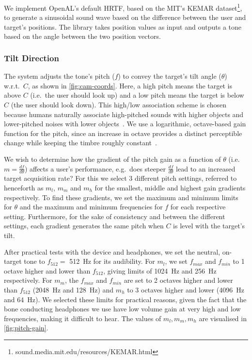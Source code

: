 \documentclass[sigconf, screen=true, anonymous=true]{acmart}
\begin{document}
We implement OpenAL's default HRTF, based on the MIT's KEMAR dataset\footnote{sound.media.mit.edu/resources/KEMAR.html}, to generate a sinusoidal sound wave based on the difference between the user and target's positions.
The library takes position values as input and outputs a tone based on the angle between the two position vectors. 

\subsubsection{Tilt Direction}

The system adjusts the tone's pitch ($f$) to convey the target's tilt angle ($\theta$) w.r.t.\ $C$, as shown in \cref{fig:cam-coords}. 
Here, a high pitch means the target is above $C$ (i.e.\ the user should look up) and a low pitch means the target is below $C$ (the user should look down).
This high/low association scheme is chosen because humans naturally associate high-pitched sounds with higher objects and lower-pitched noises with lower objects~\cite{pratt1930spatial, blauert1997spatial}.
We use a logarithmic, octave-based gain function for the pitch, since an increase in octave provides a distinct perceptible change while keeping the timbre roughly constant~\cite{shepard1964circularity}.

We wish to determine how the gradient of the pitch gain as a function of $\theta$ (i.e.\ $m = \frac{df}{d\theta}$) affects a user's performance, e.g.\ does steeper $\frac{df}{d\theta}$ lead to an increased target acquisition rate?
For this we select 3 different pitch settings, referred to henceforth as $m_l$, $m_m$ and $m_h$ for the smallest, middle and highest gain gradients respectively. 
To find these gradients, we set the maximum and minimum limits for $\theta$ and the maximum and minimum frequencies for $f$ for each respective setting.
Furthermore, for the sake of consistency and between the different settings, each gradient generates the same pitch when $C$ is level with the target's tilt. 

After practical tests with the device and headphones, we set the neutral, on-target tone to $f_{512} =$ \SI{512}{\hertz} for its audibility.
For $m_l$, we set $f_{max}$ and $f_{min}$ to 1 octave higher and lower than $f_{512}$, giving limits of \SI{1024}{\hertz} and \SI{256}{\hertz} respectively.
For $m_m$, the $f_{max}$ and $f_{min}$ are set to 2 octaves higher and lower than $f_{512}$ (\SI{2048}{\hertz} and \SI{128}{\hertz}) and $m_h$ to 3 octaves higher and lower (\SI{4096}{\hertz} and \SI{64}{\hertz}).
We selected these limits for practical reasons, given the fact that the bone conducting headphones we use have low volume gain at very high and low frequencies, making it difficult to hear. 
The values of $m_l, m_m, m_h$ are visualised in \cref{fig:pitch-gain}.
\end{document}
